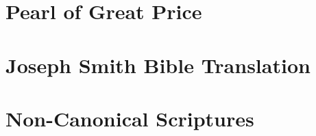	
	
	
	
	
	
	
	
	
	
	
	
	
	
	
	
	
	
	
	
	
	
\section{Pearl of Great Price} %
	\label{PGP}

	
	
	
	
	
	
\section{Joseph Smith Bible Translation} %
	\label{JST}
	
	
	
\section{Non-Canonical Scriptures}
	\label{NONCANON}
	
	
	
\pagebreak{}
